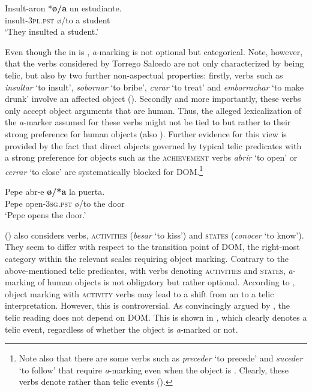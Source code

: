 \documentclass[output=paper]{LSP/langsci}
\begin{document}
\ea \label{08-ga-ex:13}
\gll Insult-aron *\textbf{ø/a} un estudiante.\\
insult-\textsc{3pl}.\textsc{pst} ø/to a student\\
\glt ‘They insulted a student.’
\z

Even though the  in  is , \textit{a}-marking is not optional but categorical. Note, however, that the verbs considered by Torrego Salcedo are not only characterized by being telic, but also by two further non-aspectual properties: firstly, verbs such as \textit{insultar} ‘to insult’, \textit{sobornar} ‘to bribe’, \textit{curar} ‘to treat’ and \textit{emborrachar} ‘to make drunk’ involve an affected object (\cf {}). Secondly and more importantly, these verbs only accept object arguments that are human. Thus, the alleged lexicalization of the \textit{a}-marker assumed for these verbs might not be tied to  but rather to their strong preference for human objects (\cf also \citealt[28--29]{vonHeusinger2008Verbal}). Further evidence for this view is provided by the fact that direct objects governed by typical telic predicates with a strong preference for  objects such as the \textsc{achievement} verbs \textit{abrir} ‘to open’ or \textit{cerrar} ‘to close’ are systematically blocked for DOM.\footnote{Note also that there are some verbs such as \textit{preceder} ‘to precede’ and \textit{suceder} ‘to follow’ that require \textit{a}-marking even when the object is . Clearly, these verbs denote  rather than telic events (\cf {}).} 

\ea \label{08-ga-ex:14}
\gll Pepe abr-e \textbf{ø/*a} la puerta.\\
Pepe open-\textsc{3sg}.\textsc{pst} ø/to the door\\
\glt ‘Pepe opens the door.’
\z

\citeauthor{Torrego1999Gramatica} (\citeyear{Torrego1999Gramatica}) also considers  verbs, \ie {} \textsc{activities} (\eg \textit{besar} ‘to kiss’) and \textsc{states} (\eg \textit{conocer} ‘to know’). They seem to differ with respect to the transition point of DOM, \ie the right-most category within the relevant scales requiring object marking. Contrary to the above-mentioned telic predicates, with verbs denoting \textsc{activities} and \textsc{states,} \textit{a}-marking of  human objects is not obligatory but rather optional. According to \citet[1788--1789]{Torrego1999Gramatica}, object marking with \textsc{activity} verbs may lead to a shift from an  to a telic interpretation. However, this is controversial. As convincingly argued by \citet[95--97]{Delbecque2002Construction}, the telic reading does not depend on DOM. This is shown in , which clearly denotes a telic event, regardless of whether the object is \textit{a}-marked or not.
\end{document}
